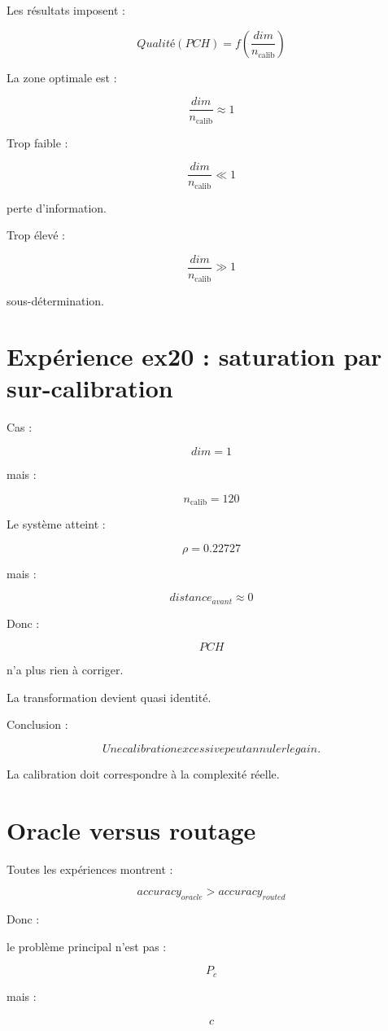 \documentclass[11pt]{article}
\begin{document}
Les résultats imposent :

\[
\boxed{
Qualité(PCH)=f
\left(
\frac{dim}{n_{\mathrm{calib}}}
\right)
}
\]


La zone optimale est :

\[
\boxed{
\frac{dim}{n_{\mathrm{calib}}}\approx1
}
\]


Trop faible :

\[
\frac{dim}{n_{\mathrm{calib}}}\ll1
\]

perte d'information.


Trop élevé :

\[
\frac{dim}{n_{\mathrm{calib}}}\gg1
\]

sous-détermination.


\section{Expérience ex20 : saturation par sur-calibration}


Cas :

\[
dim=1
\]

mais :

\[
n_{\mathrm{calib}}=120
\]


Le système atteint :

\[
\rho=0.22727
\]


mais :

\[
distance_{avant}
\approx0
\]


Donc :

\[
PCH
\]

n'a plus rien à corriger.


La transformation devient quasi identité.


Conclusion :


\[
\boxed{
Une calibration excessive peut annuler le gain.
}
\]


La calibration doit correspondre à la complexité réelle.


\section{Oracle versus routage}


Toutes les expériences montrent :


\[
accuracy_{oracle}
>
accuracy_{routed}
\]


Donc :

le problème principal n'est pas :

\[
P_c
\]


mais :

\[
\hat c
\]
\end{document}
